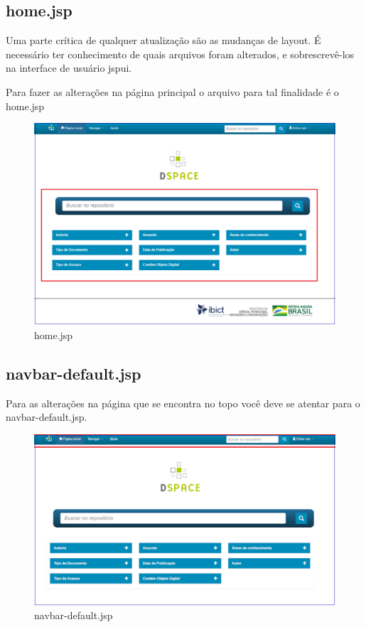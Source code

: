 \documentclass[12pt,hidelinks]{article}
\begin{document}
\subsection{home.jsp}

Uma parte crítica de qualquer atualização são as mudanças de layout. É necessário ter conhecimento de quais arquivos foram alterados, e sobrescrevê-los na interface de usuário jspui. 

Para fazer as alterações na página principal o arquivo para tal finalidade é o home.jsp

        \begin{figure}[!htp]
                \centering
                \includegraphics[scale=0.5]{figura/home.png}
                \caption{home.jsp}
            \label{Rotulo}
        \end{figure}

\subsection{navbar-default.jsp}
Para as alterações na página que se encontra no topo você deve se atentar para o navbar-default.jsp.

\begin{figure}[!htp]
                \centering
                \includegraphics[scale=0.5]{figura/navbar-default.png}
                \caption{navbar-default.jsp}
            \label{Rotulo}
        \end{figure}
\end{document}
